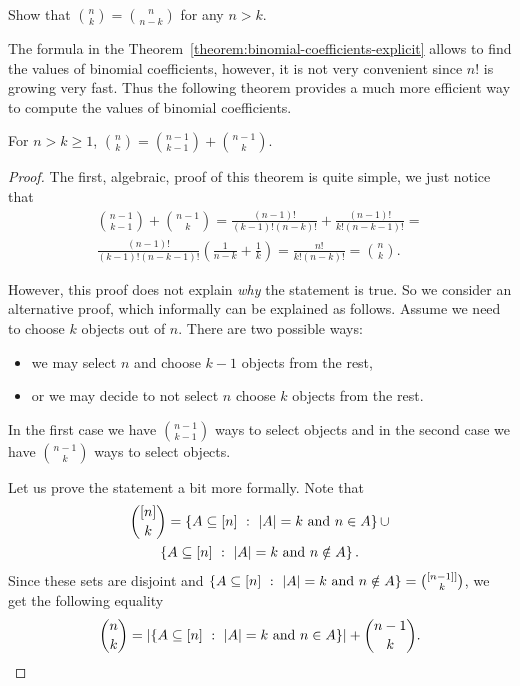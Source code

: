 \begin{exercise}
  Show that $\binom{n}{k} = \binom{n}{n - k}$ for any $n > k$.
\end{exercise}

The formula in the Theorem~\ref{theorem:binomial-coefficients-explicit} allows
to find the values of binomial coefficients, however, it is not very convenient
since $n!$ is growing very fast. Thus the following theorem provides a much more
efficient way to compute the values of binomial coefficients.

\begin{theorem}
\label{theorem:pascals-rule}
  For $n > k \ge 1$, $\binom{n}{k} = \binom{n - 1}{k - 1} + \binom{n - 1}{k}$.
\end{theorem}
\begin{proof}
  The first, algebraic, proof of this theorem is quite simple, we just notice
  that
  \begin{multline*}
    \binom{n - 1}{k - 1} + \binom{n - 1}{k} =
      \frac{(n - 1)!}{(k - 1)!(n - k)!} + \frac{(n - 1)!}{k!(n - k - 1)!} = \\
      \frac{(n - 1)!}{(k - 1)! (n - k - 1)!}
        \left(
          \frac{1}{n - k} + \frac{1}{k}
        \right) = \frac{n!}{k! (n - k)!} = \binom{n}{k}.
  \end{multline*}

  However, this proof does not explain \emph{why} the statement is true.
  So we consider an alternative proof, which informally can be explained as
  follows. Assume we need to choose $k$ objects out of $n$. There are two
  possible ways:
  \begin{itemize}
    \item we may select $n$ and choose $k - 1$ objects from the rest,
    \item or we may decide to not select $n$ choose $k$ objects from the rest.
  \end{itemize}
  In the first case we have $\binom{n - 1}{k - 1}$ ways to select objects and
  in the second case we have $\binom{n - 1}{k}$ ways to select objects.

  Let us prove the statement a bit more formally. Note that
  \begin{multline*}
    \subsets[k]{\range{n}} = 
      \set[\cardinality{A} = k \text{ and } n \in A]{A \subseteq \range{n}} \cup \\
    \set[\cardinality{A} = k \text{ and } n \notin A]{A \subseteq \range{n}}.
  \end{multline*}
  Since these sets are disjoint and 
  $\set[\cardinality{A} = k \text{ and } n \notin A]{A \subseteq \range{n}} = 
  \subsets[k]{\range{n - 1]}}$, we get the following equality
  \[
    \binom{n}{k} = 
    \cardinality{\set[\cardinality{A} = k \text{ and } n \in A]{A \subseteq \range{n}}} +
    \binom{n - 1}{k}.
  \]


\end{proof}
